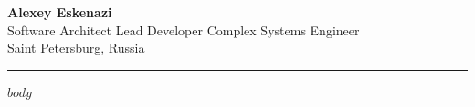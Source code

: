 \documentclass[10pt,a4paper]{article}
\begin{document}
\begin{center}
  {\LARGE\bfseries\color{accent} Alexey Eskenazi}\\[0.35em]
  {\normalsize\color{muted} Software Architect \textbullet{} Lead Developer \textbullet{} Complex Systems Engineer}\\[0.25em]
  {\small Saint Petersburg, Russia}
\end{center}
\vspace{0.3em}
\hrule
\vspace{0.7em}

$body$
\end{document}
